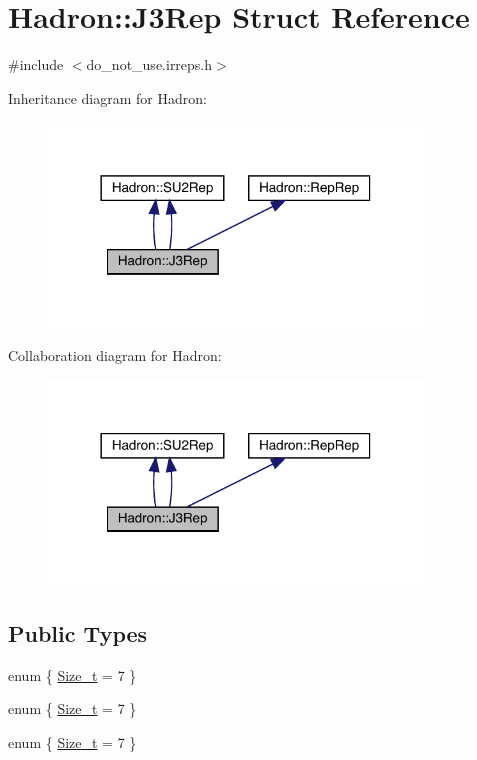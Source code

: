 \hypertarget{structHadron_1_1J3Rep}{}\section{Hadron\+:\+:J3\+Rep Struct Reference}
\label{structHadron_1_1J3Rep}


{\ttfamily \#include $<$do\+\_\+not\+\_\+use.\+irreps.\+h$>$}



Inheritance diagram for Hadron\+:\nopagebreak
\begin{figure}[H]
\begin{center}
\leavevmode
\includegraphics[width=282pt]{dd/d34/structHadron_1_1J3Rep__inherit__graph}
\end{center}
\end{figure}


Collaboration diagram for Hadron\+:\nopagebreak
\begin{figure}[H]
\begin{center}
\leavevmode
\includegraphics[width=282pt]{de/d43/structHadron_1_1J3Rep__coll__graph}
\end{center}
\end{figure}
\subsection*{Public Types}
\begin{DoxyCompactItemize}
\item 
enum \{ \mbox{\hyperlink{structHadron_1_1J3Rep_a01001f359a9ba212165295d45ac3a79cabc2ea108a2c20f2a53588a413ad5d4f7}{Size\+\_\+t}} = 7
 \}
\item 
enum \{ \mbox{\hyperlink{structHadron_1_1J3Rep_a01001f359a9ba212165295d45ac3a79cabc2ea108a2c20f2a53588a413ad5d4f7}{Size\+\_\+t}} = 7
 \}
\item 
enum \{ \mbox{\hyperlink{structHadron_1_1J3Rep_a01001f359a9ba212165295d45ac3a79cabc2ea108a2c20f2a53588a413ad5d4f7}{Size\+\_\+t}} = 7
 \}
\end{DoxyCompactItemize}
